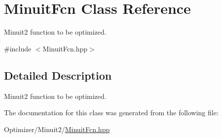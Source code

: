 \hypertarget{class_minuit_fcn}{\section{Minuit\-Fcn Class Reference}
\label{class_minuit_fcn}
}


Minuit2 function to be optimized.  




{\ttfamily \#include $<$Minuit\-Fcn.\-hpp$>$}



\subsection{Detailed Description}
Minuit2 function to be optimized. 

The documentation for this class was generated from the following file\-:\begin{DoxyCompactItemize}
\item 
Optimizer/\-Minuit2/\hyperlink{_minuit_fcn_8hpp}{Minuit\-Fcn.\-hpp}\end{DoxyCompactItemize}
